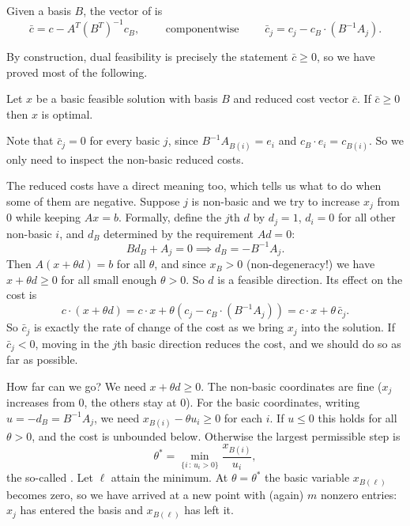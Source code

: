 \begin{definition}
    Given a basis $B$, the vector of  is
    $$
    \bar c = c - A^T(B^T)^{-1}c_B, \qquad\text{ componentwise }\qquad \bar c_j = c_j - c_B\cdot(B^{-1}A_j).
    $$
\end{definition}

By construction, dual feasibility is precisely the statement $\bar c \geq 0$, so we have proved most of the following.

\begin{theorem}
    Let $x$ be a basic feasible solution with basis $B$ and reduced cost vector $\bar c$. If $\bar c \geq 0$ then $x$ is optimal.
\end{theorem}

Note that $\bar c_j = 0$ for every basic $j$, since $B^{-1}A_{B(i)} = e_i$ and $c_B \cdot e_i = c_{B(i)}$. So we only need to inspect the non-basic reduced costs.

The reduced costs have a direct meaning too, which tells us what to do when some of them are negative. Suppose $j$ is non-basic and we try to increase $x_j$ from $0$ while keeping $Ax = b$. Formally, define the $j$th  $d$ by $d_j = 1$, $d_i = 0$ for all other non-basic $i$, and $d_B$ determined by the requirement $Ad = 0$:
$$
Bd_B + A_j = 0 \implies d_B = -B^{-1}A_j.
$$
Then $A(x + \theta d) = b$ for all $\theta$, and since $x_B > 0$ (non-degeneracy!) we have $x + \theta d \geq 0$ for all small enough $\theta > 0$. So $d$ is a feasible direction. Its effect on the cost is
$$
c\cdot(x + \theta d) = c\cdot x + \theta\left(c_j - c_B\cdot(B^{-1}A_j)\right) = c\cdot x + \theta\,\bar c_j.
$$
So $\bar c_j$ is exactly the rate of change of the cost as we bring $x_j$ into the solution. If $\bar c_j < 0$, moving in the $j$th basic direction reduces the cost, and we should do so as far as possible.

How far can we go? We need $x + \theta d \geq 0$. The non-basic coordinates are fine ($x_j$ increases from $0$, the others stay at $0$). For the basic coordinates, writing $u = -d_B = B^{-1}A_j$, we need $x_{B(i)} - \theta u_i \geq 0$ for each $i$. If $u \leq 0$ this holds for all $\theta > 0$, and the cost is unbounded below. Otherwise the largest permissible step is
$$
\theta^* = \min_{\{i\, :\, u_i > 0\}}\frac{x_{B(i)}}{u_i},
$$
the so-called . Let $\ell$ attain the minimum. At $\theta = \theta^*$ the basic variable $x_{B(\ell)}$ becomes zero, so we have arrived at a new point with (again) $m$ nonzero entries: $x_j$ has entered the basis and $x_{B(\ell)}$ has left it.

